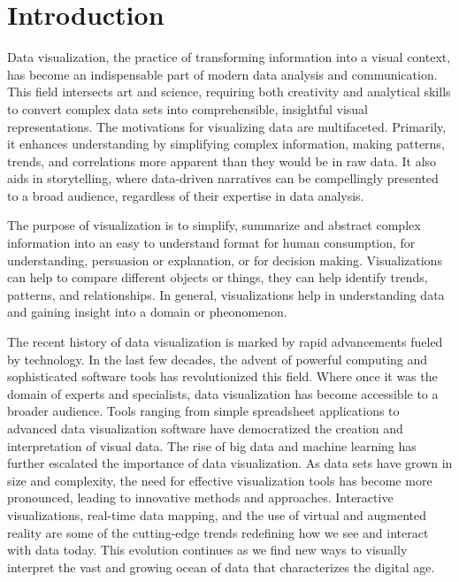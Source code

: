 %
%
\section{Introduction}

Data visualization, the practice of transforming information into a visual context, has become an indispensable part of modern data analysis and communication. This field intersects art and science, requiring both creativity and analytical skills to convert complex data sets into comprehensible, insightful visual representations. The motivations for visualizing data are multifaceted. Primarily, it enhances understanding by simplifying complex information, making patterns, trends, and correlations more apparent than they would be in raw data. It also aids in storytelling, where data-driven narratives can be compellingly presented to a broad audience, regardless of their expertise in data analysis.

The purpose of visualization is to simplify, summarize and abstract complex information into an easy to understand format for human consumption, for understanding, persuasion or explanation, or for decision making. Visualizations can help to compare different objects or things, they can help identify trends, patterns, and relationships. In general, visualizations help in understanding data and gaining insight into a domain or pheonomenon.

The recent history of data visualization is marked by rapid advancements fueled by technology. In the last few decades, the advent of powerful computing and sophisticated software tools has revolutionized this field. Where once it was the domain of experts and specialists, data visualization has become accessible to a broader audience. Tools ranging from simple spreadsheet applications to advanced data visualization software have democratized the creation and interpretation of visual data. The rise of big data and machine learning has further escalated the importance of data visualization. As data sets have grown in size and complexity, the need for effective visualization tools has become more pronounced, leading to innovative methods and approaches. Interactive visualizations, real-time data mapping, and the use of virtual and augmented reality are some of the cutting-edge trends redefining how we see and interact with data today. This evolution continues as we find new ways to visually interpret the vast and growing ocean of data that characterizes the digital age.

